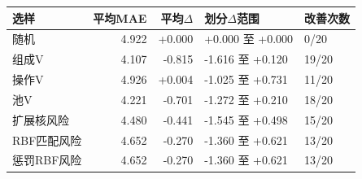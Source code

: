 \begin{tabular}{lrrll}\toprule
选样 & 平均MAE & 平均$\Delta$ & 划分$\Delta$范围 & 改善次数 \\ \midrule
随机 & 4.922 & +0.000 & +0.000 至 +0.000 & 0/20 \\
组成V & 4.107 & -0.815 & -1.616 至 +0.120 & 19/20 \\
操作V & 4.926 & +0.004 & -1.025 至 +0.731 & 11/20 \\
池V & 4.221 & -0.701 & -1.272 至 +0.210 & 18/20 \\
扩展核风险 & 4.480 & -0.441 & -1.545 至 +0.498 & 15/20 \\
RBF匹配风险 & 4.652 & -0.270 & -1.360 至 +0.621 & 13/20 \\
惩罚RBF风险 & 4.652 & -0.270 & -1.360 至 +0.621 & 13/20 \\
\bottomrule\end{tabular}
